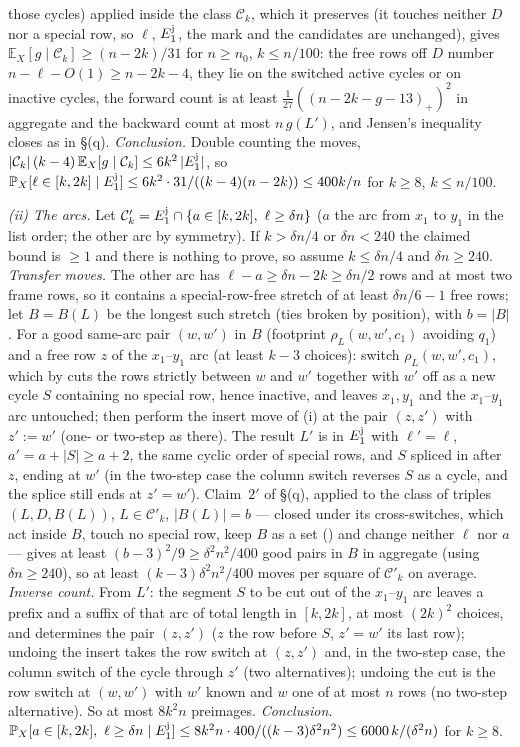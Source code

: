 those cycles) applied inside the class $\mathcal C_k$, which it
preserves (it touches neither $D$ nor a special row, so $\ell$,
$E_1^{\rm j}$, the mark and the candidates are unchanged), gives
$\mathbb E_X[g\mid\mathcal C_k]\ge(n-2k)/31$ for $n\ge n_0$, $k\le
n/100$: the free rows off $D$ number $n-\ell-O(1)\ge n-2k-4$, they
lie on the switched active cycles or on inactive cycles, the forward
count is at least $\frac1{27}((n-2k-g-13)_+)^2$ in aggregate and the
backward count at most $n\,g(L')$, and Jensen's inequality closes as
in \S(q).  \emph{Conclusion.}  Double counting the moves,
$|\mathcal C_k|\,(k-4)\,\mathbb E_X[g\mid\mathcal C_k]\le6k^2\,|E_1^{\rm j}|$,
so $\Pr_X[\ell\in[k,2k]\mid E_1^{\rm j}]\le 6k^2\cdot31/((k-4)(n-2k))\le 400k/n$
for $k\ge8$, $k\le n/100$.

\emph{(ii) The arcs.}  Let $\mathcal C'_k=E_1^{\rm j}\cap\{a\in[k,2k],\ \ell\ge\delta n\}$
($a$ the arc from $x_1$ to $y_1$ in the list order; the other arc by
symmetry).  If $k>\delta n/4$ or $\delta n<240$ the claimed bound is
$\ge1$ and there is nothing to prove, so assume $k\le\delta n/4$ and
$\delta n\ge240$.  \emph{Transfer moves.}  The other arc has
$\ell-a\ge\delta n-2k\ge\delta n/2$ rows and at most two frame rows,
so it contains a special-row-free stretch of at least $\delta n/6-1$
free rows; let $B=B(L)$ be the longest such stretch (ties broken by
position), with $b=|B|$.  For a good same-arc pair $(w,w')$ in $B$
(footprint $\rho_L(w,w',c_1)$ avoiding $q_1$) and a free row $z$ of
the $x_1$--$y_1$ arc (at least $k-3$ choices): switch
$\rho_L(w,w',c_1)$, which by \cite[Lemma~2.4(1)]{AM26} cuts the rows
strictly between $w$ and $w'$ together with $w'$ off as a new cycle
$S$ containing no special row, hence inactive, and leaves $x_1,y_1$
and the $x_1$--$y_1$ arc untouched; then perform the insert move of
(i) at the pair $(z,z')$ with $z':=w'$ (one- or two-step as there).
The result $L'$ is in $E_1^{\rm j}$ with $\ell'=\ell$, $a'=a+|S|\ge a+2$,
the same cyclic order of special rows, and $S$ spliced in after $z$,
ending at $w'$ (in the two-step case the column switch reverses $S$
as a cycle, and the splice still ends at $z'=w'$).  Claim~$2'$ of
\S(q), applied to the class of triples $(L,D,B(L))$, $L\in\mathcal C'_k$,
$|B(L)|=b$ --- closed under its cross-switches, which act inside $B$,
touch no special row, keep $B$ as a set (\cite[Remark~2.7]{AM26}) and
change neither $\ell$ nor $a$ --- gives at least $(b-3)^2/9\ge\delta^2n^2/400$
good pairs in $B$ in aggregate (using $\delta n\ge240$), so at least
$(k-3)\delta^2n^2/400$ moves per square of $\mathcal C'_k$ on average.
\emph{Inverse count.}  From $L'$: the segment $S$ to be cut out of
the $x_1$--$y_1$ arc leaves a prefix and a suffix of that arc of total
length in $[k,2k]$, at most $(2k)^2$ choices, and determines the pair
$(z,z')$ ($z$ the row before $S$, $z'=w'$ its last row); undoing the
insert takes the row switch at $(z,z')$ and, in the two-step case, the
column switch of the cycle through $z'$ (two alternatives); undoing
the cut is the row switch at $(w,w')$ with $w'$ known and $w$ one of
at most $n$ rows (no two-step alternative).  So at most $8k^2n$
preimages.  \emph{Conclusion.}
$\Pr_X[a\in[k,2k],\ \ell\ge\delta n\mid E_1^{\rm j}]\le8k^2n\cdot400/((k-3)\delta^2n^2)\le6000\,k/(\delta^2n)$
for $k\ge8$.

